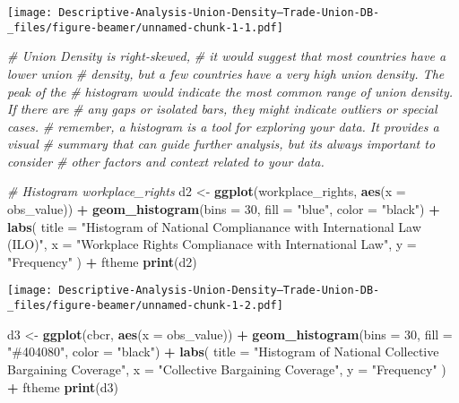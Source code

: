 \documentclass[
  ignorenonframetext,
]{beamer}
\newenvironment{Shaded}{\begin{snugshade}}{\end{snugshade}}
\newcommand{\AttributeTok}[1]{\textcolor[rgb]{0.13,0.29,0.53}{#1}}
\newcommand{\CommentTok}[1]{\textcolor[rgb]{0.56,0.35,0.01}{\textit{#1}}}
\newcommand{\DecValTok}[1]{\textcolor[rgb]{0.00,0.00,0.81}{#1}}
\newcommand{\FunctionTok}[1]{\textcolor[rgb]{0.13,0.29,0.53}{\textbf{#1}}}
\newcommand{\NormalTok}[1]{#1}
\newcommand{\OtherTok}[1]{\textcolor[rgb]{0.56,0.35,0.01}{#1}}
\newcommand{\SpecialCharTok}[1]{\textcolor[rgb]{0.81,0.36,0.00}{\textbf{#1}}}
\newcommand{\StringTok}[1]{\textcolor[rgb]{0.31,0.60,0.02}{#1}}
\begin{document}
\begin{frame}[fragile]
\texttt{[image: Descriptive-Analysis-Union-Density--Trade-Union-DB-\_files/figure-beamer/unnamed-chunk-1-1.pdf]}

\begin{Shaded}
\begin{Highlighting}[]
\CommentTok{\# Union Density is right{-}skewed,}
\CommentTok{\# it would suggest that most countries have a lower union}
\CommentTok{\# density, but a few countries have a very high union density. The peak of the}
\CommentTok{\# histogram would indicate the most common range of union density. If there are}
\CommentTok{\# any gaps or isolated bars, they might indicate outliers or special cases.}
\CommentTok{\# remember, a histogram is a tool for exploring your data. It provides a visual}
\CommentTok{\# summary that can guide further analysis, but it\textquotesingle{}s always important to consider}
\CommentTok{\# other factors and context related to your data.}




\CommentTok{\# Histogram workplace\_rights}
\NormalTok{d2 }\OtherTok{\textless{}{-}} \FunctionTok{ggplot}\NormalTok{(workplace\_rights, }\FunctionTok{aes}\NormalTok{(}\AttributeTok{x =}\NormalTok{ obs\_value)) }\SpecialCharTok{+}
  \FunctionTok{geom\_histogram}\NormalTok{(}\AttributeTok{bins =} \DecValTok{30}\NormalTok{, }\AttributeTok{fill =} \StringTok{"blue"}\NormalTok{, }\AttributeTok{color =} \StringTok{"black"}\NormalTok{) }\SpecialCharTok{+}
  \FunctionTok{labs}\NormalTok{(}
    \AttributeTok{title =} \StringTok{"Histogram of National Complianance with International Law (ILO)"}\NormalTok{,}
    \AttributeTok{x =} \StringTok{"Workplace Rights Complianace with International Law"}\NormalTok{,}
    \AttributeTok{y =} \StringTok{"Frequency"}
\NormalTok{  ) }\SpecialCharTok{+}
\NormalTok{  ftheme}
\FunctionTok{print}\NormalTok{(d2)}
\end{Highlighting}
\end{Shaded}

\texttt{[image: Descriptive-Analysis-Union-Density--Trade-Union-DB-\_files/figure-beamer/unnamed-chunk-1-2.pdf]}

\begin{Shaded}
\begin{Highlighting}[]
\NormalTok{d3 }\OtherTok{\textless{}{-}} \FunctionTok{ggplot}\NormalTok{(cbcr, }\FunctionTok{aes}\NormalTok{(}\AttributeTok{x =}\NormalTok{ obs\_value)) }\SpecialCharTok{+}
  \FunctionTok{geom\_histogram}\NormalTok{(}\AttributeTok{bins =} \DecValTok{30}\NormalTok{, }\AttributeTok{fill =} \StringTok{"\#404080"}\NormalTok{, }\AttributeTok{color =} \StringTok{"black"}\NormalTok{) }\SpecialCharTok{+}
  \FunctionTok{labs}\NormalTok{(}
    \AttributeTok{title =} \StringTok{"Histogram of National Collective Bargaining Coverage"}\NormalTok{,}
    \AttributeTok{x =} \StringTok{"Collective Bargaining Coverage"}\NormalTok{,}
    \AttributeTok{y =} \StringTok{"Frequency"}
\NormalTok{  ) }\SpecialCharTok{+}
\NormalTok{  ftheme}
\FunctionTok{print}\NormalTok{(d3)}
\end{Highlighting}
\end{Shaded}


\end{frame}
\end{document}
